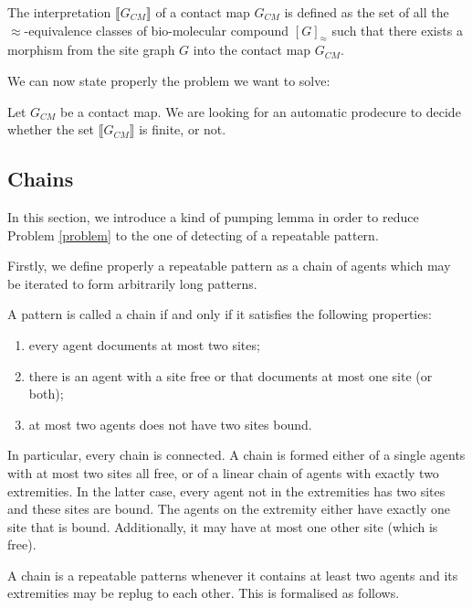 \documentclass{entcs}
\newcommand{\graphsymb}{G}
\newcommand{\iso}{\approx}
\begin{document}
\begin{defn}
The interpretation $\llbracket \graphsymb_{\textit{CM}} \rrbracket$ of a contact map $\graphsymb_{\textit{CM}}$ is defined as the set of all the $\iso$-equivalence classes of bio-molecular compound $[G]_{\iso}$ such that there exists a morphism from the site graph $G$ into the contact map $\graphsymb_{\textit{CM}}$.
\end{defn}

We can now state properly the problem we want to solve:
\begin{problem}\label{problem}
Let $\graphsymb_{\textit{CM}}$ be a contact map.
We are looking for an automatic prodecure to decide whether
the set $\llbracket \graphsymb_{\textit{CM}} \rrbracket$ is finite, or not.
\end{problem}

\subsection{Chains}

In this section, we introduce a kind of pumping lemma in order to reduce
Problem \ref{problem} to the one of detecting of a repeatable pattern.

Firstly, we define properly a repeatable pattern as a chain of agents which may be iterated to form arbitrarily long patterns.

\begin{defn}[Chain]
A pattern is called a chain if and only if it satisfies the following properties:
\begin{enumerate}
  \item every agent documents at most two sites;
  \item there is an agent with a site free or
  that documents at most one site (or both);
  \item at most two agents does not have two sites bound.
\end{enumerate}
\end{defn}

In particular, every chain is connected.
A chain is formed either of a single agents with at most two sites all free, or of a linear chain of agents with exactly two extremities. In the latter case, every agent not in the extremities has two sites and these sites are bound. The agents on the extremity either have exactly one site that is bound. Additionally, it may have at most one other site (which is free).

A chain is a repeatable patterns whenever it contains at least two agents and its extremities may be replug to each other. This is formalised as follows.
\end{document}

